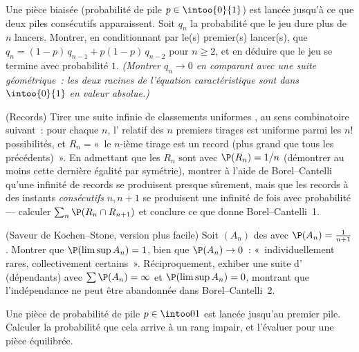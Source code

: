 \begin{exercise}[$\star\star$]\label{exo:b2:proba:6}
Une pièce biaisée (probabilité de pile $p \in \intoo{0}{1}$) est lancée
jusqu'à ce que deux piles consécutifs apparaissent. Soit $q_n$ la probabilité
que le jeu dure plus de $n$ lancers. Montrer, en conditionnant par
le(s) premier(s) lancer(s), que $q_n = (1-p)\,q_{n-1} + p(1-p)\,q_{n-2}$
pour $n \geq 2$, et en déduire que le jeu se termine avec probabilité
$1$. \emph{(Montrer $q_n \to 0$ en comparant avec une suite
géométrique~: les deux racines de l'équation caractéristique sont
dans $\intoo{0}{1}$ en valeur absolue.)}
\end{exercise}

\begin{exercise}[$\star\star\star$]\label{exo:b2:proba:7}
(Records) Tirer une suite infinie de classements uniformes ,
au sens combinatoire suivant~: pour chaque $n$, l'
relatif des $n$ premiers tirages est uniforme parmi les $n!$
possibilités, et $R_n = {}$«~le $n$-ième tirage est un record (plus grand
que tous les précédents)~». En admettant que les  $R_n$ sont
 avec $\P(R_n) = 1/n$ (démontrer au moins cette dernière
égalité par symétrie), montrer à l'aide de Borel--Cantelli qu'une infinité
de records se produisent presque sûrement, mais que les records à des instants
\emph{consécutifs} $n, n+1$ se produisent une infinité de fois avec
probabilité --- calculer $\sum_n \P(R_n \cap R_{n+1})$ et
conclure ce que donne Borel--Cantelli~1.
\end{exercise}

\begin{exercise}[$\star\star\star$]\label{exo:b2:proba:8}
(Saveur de Kochen--Stone, version plus facile) Soit $(A_n)$ des
 avec $\P(A_n) = \frac{1}{n+1}$. Montrer que
$\P(\limsup A_n) = 1$, bien que $\P(A_n) \to 0$~: «~individuellement
rares, collectivement certains~». Réciproquement, exhiber une suite
d' (dépendants) avec $\sum\P(A_n) = \infty$ et
$\P(\limsup A_n) = 0$, montrant que l'indépendance ne peut être abandonnée dans
Borel--Cantelli~2.
\end{exercise}

\begin{exercise}[$\star$]\label{exo:b2:proba:9}
Une pièce de probabilité de pile $p \in \intoo01$ est lancée jusqu'au
premier pile. Calculer la probabilité que cela arrive à un
rang impair, et l'évaluer pour une pièce équilibrée.
\end{exercise}

